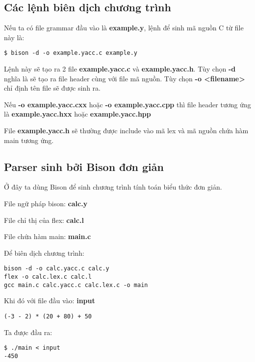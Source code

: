 \documentclass[../report.tex]{subfiles}
\begin{document}
\subsection{Các lệnh biên dịch chương trình}
Nếu ta có file grammar đầu vào là \textbf{example.y}, 
lệnh để sinh mã nguồn C từ file này là: 
\begin{verbatim}
$ bison -d -o example.yacc.c example.y
\end{verbatim}
Lệnh này sẽ tạo ra 2 file \textbf{example.yacc.c} và 
\textbf{example.yacc.h}. 
Tùy chọn \textbf{-d} nghĩa là sẽ tạo ra file header 
cùng với file mã nguồn. Tùy chọn \textbf{-o <filename>} 
chỉ định tên file sẽ được sinh ra. 

Nếu \textbf{-o example.yacc.cxx} hoặc \textbf{-o example.yacc.cpp}
thì file header tương 
ứng là \textbf{example.yacc.hxx} hoặc \textbf{example.yacc.hpp}

File \textbf{example.yacc.h} sẽ thường được include vào 
mã lex và mã nguồn chứa hàm main tương ứng. 

\subsection{Parser sinh bởi Bison đơn giản}
Ở đây ta dùng Bison để sinh chương trình tính toán 
biểu thức đơn giản.

File ngữ pháp bison: \textbf{calc.y}


File chỉ thị của flex: \textbf{calc.l}


File chứa hàm main: \textbf{main.c}


Để biên dịch chương trình: 
\begin{verbatim}
bison -d -o calc.yacc.c calc.y
flex -o calc.lex.c calc.l
gcc main.c calc.yacc.c calc.lex.c -o main
\end{verbatim}
 
Khi đó với file đầu vào: \textbf{input}
\begin{verbatim}
(-3 - 2) * (20 + 80) + 50
\end{verbatim}

Ta được đầu ra: 
\begin{verbatim}
$ ./main < input
-450
\end{verbatim}
\end{document}
